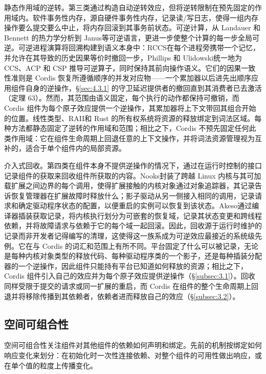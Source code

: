 静态作用域的逆转。第三类通过构造自动逆转效应，但将逆转限制在预先固定的作用域内。软件事务性内存\cite{ref107,ref108}，源自硬件事务性内存\cite{ref109}，记录读/写日志，使得一组内存操作要么提交要么中止，将内存回滚到其事务前状态。可逆计算，从 Landauer 和 Bennett 的热力学分析\cite{ref110,ref111}到 Janus\cite{ref112}等可逆语言，更进一步使整个计算的每一步全局可逆。可逆进程演算将回溯构建到语义本身中：RCCS\cite{ref113}在每个进程旁携带一个记忆，并允许在其导致的历史因果等价时撤回一步，Phillips 和 Ulidowski\cite{ref114}统一地为 CCS、ACP 和 CSP 推导可逆算子，同时保持其前向操作语义。它们的因果一致性准则是 Cordis 恢复所遵循顺序的并发对应物——一个累加器以后进先出顺序应用组件自身的逆操作，\S\ref{sec:4.3.1} 的守卫延迟提供者的撤回直到其消费者已去激活（定理 63）。然而，其范围由语义固定，每个执行的动作都保持可撤销，而 Cordis 组件为每个原子效应提供一个逆操作，其累加器将上下文带回其组合开始的位置。线性类型\cite{ref115}、RAII\cite{ref4}和 Rust 的所有权系统\cite{ref61}将资源的释放绑定到词法区域。每种方法都静态固定了逆转的作用域和范围；相比之下，Cordis 不预先固定任何此类作用域：它在组件生命周期上回退任意的上下文操作，并将词法资源管理视为互补的，适合于单个组件内的局部资源。

介入式回收。第四类在组件本身不提供逆操作的情况下，通过在运行时控制的接口记录组件的获取来回收组件所获取的内容。Nooks\cite{ref77}封装了跨越 Linux 内核与其可加载扩展之间边界的每个调用，使得扩展接触的内核对象通过对象追踪器，其记录告诉恢复管理器在扩展故障时释放什么；影子驱动\cite{ref78}从另一侧接入相同的调用，记录请求和确定驱动程序状态的配置，以便重启的实例可以恢复到该状态。Akeso\cite{ref116}通过编译器插装获取记录，将内核执行划分为可嵌套的恢复域，记录其状态变更和跨线程依赖，并将故障请求与依赖于它的每个域一起回滚。因此，回收源于运行时维护的记录而非开发者记得编写的清理，这使得这一族系成为可逆效应最接近的系统级先例。它在与 Cordis 的词汇和范围上有所不同。平台固定了什么可以被记录，无论是每种内核对象类型的释放代码、每种驱动程序类的一个影子，还是每种插装分配器的一个逆操作，因此组件只能持有平台已知道如何释放的资源；相比之下，Cordis 组件引入自己的效应并为每个原子效应提供逆操作（\S\ref{subsec:3.1}）。回收同样受限于提交的请求或同一扩展的重启，而 Cordis 在组件的整个生命周期上回退并将移除传播到其依赖者，依赖者进而释放自己的效应（\S\ref{subsec:3.2}）。

\subsection{空间可组合性}
\label{sec:7.4}

空间可组合性关注组件对其他组件的依赖如何声明和绑定。先前的机制按绑定如何响应变化来划分：在初始化时一次性连接依赖、对整个组件的可用性做出响应，或在单个值的粒度上传播变化。

